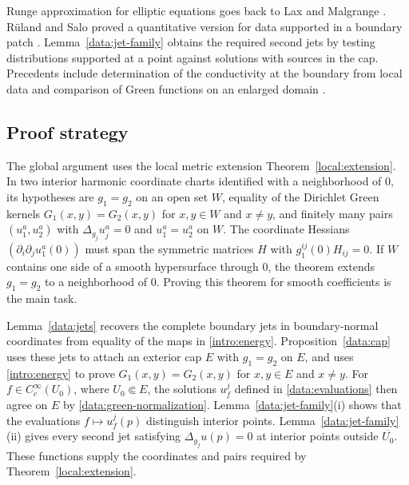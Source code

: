 \documentclass[11pt,a4paper]{article}
\theoremstyle{definition}
\theoremstyle{remark}
\numberwithin{equation}{section}
\begin{document}
Runge approximation for elliptic equations goes back to Lax and
Malgrange \cite{Lax1956,Malgrange1956}. R\"uland and Salo proved a
quantitative version for data supported in a boundary patch
\cite{RulandSalo2019}. Lemma~\ref{data:jet-family} obtains the required
second jets by testing distributions supported at a point against
solutions with sources in the cap. Precedents include determination
of the conductivity at the boundary from local data
\cite{AlessandriniGaburro2009} and comparison of Green functions on
an enlarged domain \cite[Sections~3--4]{AlessandriniKim2012}.

\subsection{Proof strategy}

The global argument uses the local metric extension
Theorem~\ref{local:extension}. In two interior harmonic coordinate
charts identified with a neighborhood of $0$, its hypotheses are
$g_1=g_2$ on an open set $W$, equality of the Dirichlet Green kernels
$G_1(x,y)=G_2(x,y)$ for $x,y\in W$ and $x\ne y$, and finitely many
pairs $(u_1^a,u_2^a)$ with $\Delta_{g_j}u_j^a=0$ and $u_1^a=u_2^a$
on $W$. The coordinate Hessians $(\partial_i\partial_j u_1^a(0))$
must span the symmetric matrices $H$ with $g_1^{ij}(0)H_{ij}=0$. If $W$ contains one side of a smooth
hypersurface through $0$, the theorem extends $g_1=g_2$ to a
neighborhood of $0$. Proving this theorem for smooth coefficients
is the main task.

Lemma~\ref{data:jets} recovers the complete boundary jets in
boundary-normal coordinates from equality of the maps in
\eqref{intro:energy}. Proposition~\ref{data:cap} uses these jets to
attach an exterior cap $E$ with $g_1=g_2$ on $E$, and uses
\eqref{intro:energy} to prove $G_1(x,y)=G_2(x,y)$ for $x,y\in E$ and
$x\ne y$. For $f\in C_c^\infty(U_0)$, where $U_0\Subset E$,
the solutions $u_f^j$ defined in \eqref{data:evaluations} then agree
on $E$ by \eqref{data:green-normalization}. Lemma~\ref{data:jet-family}(i)
shows that the evaluations $f\mapsto u_f^j(p)$ distinguish interior
points. Lemma~\ref{data:jet-family}(ii) gives every second jet
satisfying $\Delta_{g_j}u(p)=0$ at interior points outside
$\overline{U_0}$. These functions supply the coordinates and pairs
required by Theorem~\ref{local:extension}.
\end{document}
